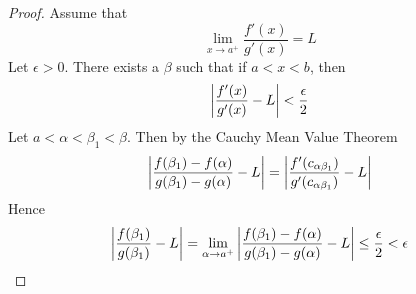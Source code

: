 \begin{proof}
Assume that \[\lim_{x\to a^+} \frac{f'(x)}{g'(x)} = L\] Let $\epsilon > 0$. There exists a $\beta$ such that if $a < x < b$, then \[\left| \frac{f'(x)}{g'(x)} -L \right| < \frac{\epsilon}{2}\]
Let $a < \alpha < \beta_1 < \beta$. Then by the Cauchy Mean Value Theorem
\[\left| \frac{f(\beta_1) - f(\alpha)}{g(\beta_1)-g(\alpha)} - L \right| = \left| \frac{f'(c_{\alpha\beta_1})}{g'(c_{\alpha\beta_1})}- L \right|\]
Hence
\[\left| \frac{f(\beta_1)}{g(\beta_1)} - L \right| = \lim_{\alpha \to a^+} \left| \frac{f(\beta_1)-f(\alpha)}{g(\beta_1) - g(\alpha)} - L \right| \leq \frac{\epsilon}{2} < \epsilon\]
\end{proof}